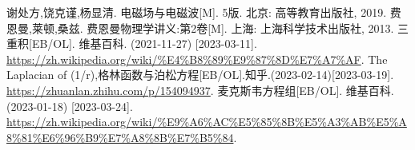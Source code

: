 \begin{thebibliography}{99}%
     谢处方,饶克谨,杨显清. 电磁场与电磁波[M]. 5版. 北京: 高等教育出版社, 2019.
     费恩曼,莱顿,桑兹. 费恩曼物理学讲义:第2卷[M]. 上海: 上海科学技术出版社, 2013.
     三重积[EB/OL]. 维基百科. (2021-11-27) [2023-03-11]. \\\url{https://zh.wikipedia.org/wiki/%E4%B8%89%E9%87%8D%E7%A7%AF}.
     The Laplacian of (1/r),格林函数与泊松方程[EB/OL].知乎.(2023-02-14)[2023-03-19].\\\url{https://zhuanlan.zhihu.com/p/154094937}.
     麦克斯韦方程组[EB/OL]. 维基百科. (2023-01-18) [2023-03-24]. \\\url{https://zh.wikipedia.org/wiki/%E9%A6%AC%E5%85%8B%E5%A3%AB%E5%A8%81%E6%96%B9%E7%A8%8B%E7%B5%84}.
\end{thebibliography}
